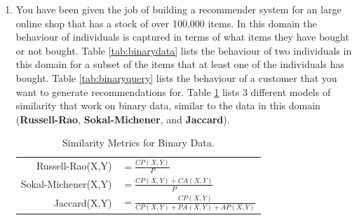 \documentclass[--SOLUTION-OPTION--]{ditpaper}
\begin{document}
			
\question 
\begin{enumerate}
	\item You have been given the job of building a recommender system for an large online shop that has a stock of over 100,000 items. In this domain the behaviour of individuals is captured in terms of what items they have bought or not bought. Table \ref{tab:binarydata} lists the behaviour of two individuals in this domain for a subset of the items that at least one of the individuals has bought. Table \ref{tab:binaryquery} lists the behaviour of a customer that you want to generate recommendations for. Table \ref{tab:similaritymetrics} lists 3 different models of similarity that work on binary data, similar to the data in this domain (\textbf{Russell-Rao}, \textbf{Sokal-Michener}, and \textbf{Jaccard}).
	\begin{table}[h]
	\begin{center}
	\begin{tabular}{rl}
	Russell-Rao(X,Y) & $= \frac{CP(X,Y)}{P}$\\
	Sokal-Michener(X,Y) & $=\frac{CP(X,Y)+CA(X,Y)}{P}$\\
	Jaccard(X,Y) & $=\frac{CP(X,Y)}{CP(X,Y)+PA(X,Y)+AP(X,Y)}$\\
	\end{tabular}
	\end{center}
	\caption{Similarity Metrics for Binary Data.}
	\label{tab:similaritymetrics}
	\end{table}


\end{enumerate}
\end{document}
